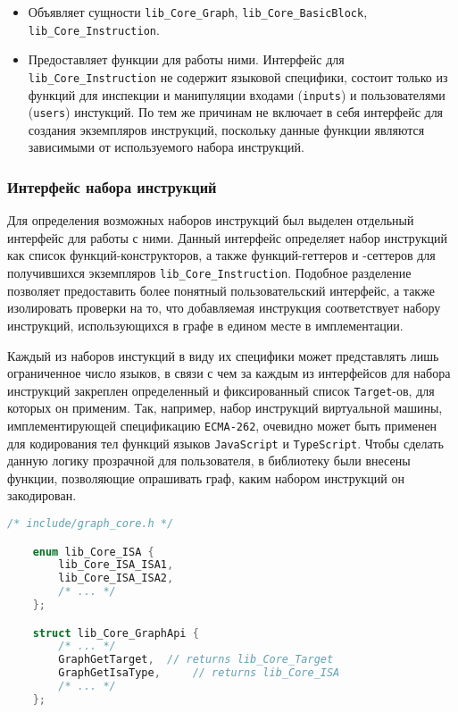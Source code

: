 \begin{itemize}
    \item Объявляет сущности \texttt{lib\_Core\_Graph}, \texttt{lib\_Core\_BasicBlock}, \texttt{lib\_Core\_Instruction}.
    \item Предоставляет функции для работы ними. Интерфейс для \texttt{lib\_Core\_Instruction} не содержит языковой специфики, состоит только из функций для инспекции и манипуляции входами (\texttt{inputs}) и пользователями (\texttt{users}) инстукций. По тем же причинам не включает в себя интерфейс для создания экземпляров инструкций, поскольку данные функции являются зависимыми от используемого набора инструкций.
\end{itemize}

\subsubsection{Интерфейс набора инструкций}

Для определения возможных наборов инструкций был выделен отдельный интерфейс для работы с ними. Данный интерфейс определяет набор инструкций как список функций-конструкторов, а также функций-геттеров и -сеттеров для получившихся экземпляров \texttt{lib\_Core\_Instruction}. Подобное разделение позволяет предоставить более понятный пользовательский интерфейс, а также изолировать проверки на то, что добавляемая инструкция соответствует набору инструкций, использующихся в графе в едином месте в имплементации.

Каждый из наборов инстукций в виду их специфики может представлять лишь ограниченное число языков, в связи с чем за каждым из интерфейсов для набора инструкций закреплен определенный и фиксированный список \texttt{Target}-ов, для которых он применим. Так, например, набор инструкций виртуальной машины, имплементирующей спецификацию \texttt{ECMA-262}, очевидно может быть применен для кодирования тел функций языков \texttt{JavaScript} и \texttt{TypeScript}. Чтобы сделать данную логику прозрачной для пользователя, в библиотеку были внесены функции, позволяющие опрашивать граф, каким набором инструкций он закодирован.

\begin{lstlisting}[language=C, label=lst:libIsaApi]
    /* include/graph_core.h */

    enum lib_Core_ISA {
        lib_Core_ISA_ISA1,
        lib_Core_ISA_ISA2,
        /* ... */
    };

    struct lib_Core_GraphApi {
        /* ... */
        GraphGetTarget,  // returns lib_Core_Target
        GraphGetIsaType,     // returns lib_Core_ISA
        /* ... */
    };
\end{lstlisting}

